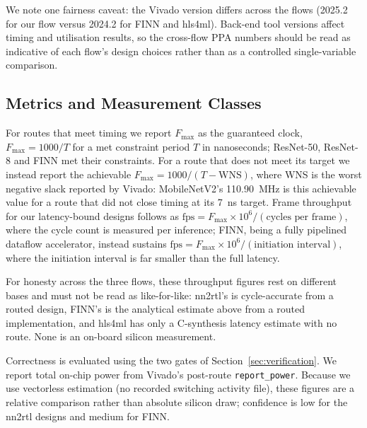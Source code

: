 \documentclass[acmtog,authorversion]{acmart}
\begin{document}
We note one fairness caveat: the Vivado version differs across the flows (2025.2 for our flow versus 2024.2 for FINN and hls4ml). Back-end tool versions affect timing and utilisation results, so the cross-flow PPA numbers should be read as indicative of each flow's design choices rather than as a controlled single-variable comparison.

\subsection{Metrics and Measurement Classes}\label{sec:metrics}

For routes that meet timing we report $F_{\max}$ as the guaranteed clock, $F_{\max} = 1000 / T$ for a met constraint period $T$ in nanoseconds; ResNet-50, ResNet-8 and FINN met their constraints. For a route that does not meet its target we instead report the achievable $F_{\max} = 1000 / (T - \text{WNS})$, where WNS is the worst negative slack reported by Vivado: MobileNetV2's 110.90~MHz is this achievable value for a route that did not close timing at its 7~ns target. Frame throughput for our latency-bound designs follows as $\text{fps} = F_{\max} \times 10^{6} / (\text{cycles per frame})$, where the cycle count is measured per inference; FINN, being a fully pipelined dataflow accelerator, instead sustains $\text{fps} = F_{\max} \times 10^{6} / (\text{initiation interval})$, where the initiation interval is far smaller than the full latency.

For honesty across the three flows, these throughput figures rest on different bases and must not be read as like-for-like: nn2rtl's is cycle-accurate from a routed design, FINN's is the analytical estimate above from a routed implementation, and hls4ml has only a C-synthesis latency estimate with no route. None is an on-board silicon measurement.

Correctness is evaluated using the two gates of Section~\ref{sec:verification}. We report total on-chip power from Vivado's post-route \texttt{report\_power}. Because we use vectorless estimation (no recorded switching activity file), these figures are a relative comparison rather than absolute silicon draw; confidence is low for the nn2rtl designs and medium for FINN.
\end{document}
